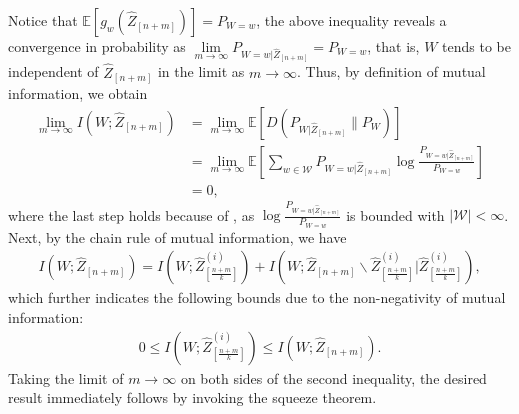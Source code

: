 \documentclass[onecolumn,romanappendices,10pt]{IEEEtran}
\newcommand{\Wcal}{{\mathcal W}}
\newcommand{\EE}{{\mathbb{E}}}
\begin{document}
	Notice that $\EE \left[ g_w(\hat{Z}_{[n+m]}) \right] = P_{W = w}$, the above inequality reveals a convergence in probability as $\lim\limits_{m \to \infty} P_{W = w | \hat{Z}_{[n+m]}} = P_{W = w}$, that is, $W$ tends to be independent of $\hat{Z}_{[n+m]}$ in the limit as $m \to \infty$. Thus, by definition of mutual information, we obtain
	\begin{equation}
		\begin{aligned}
			\lim_{m \to \infty} I\left( W; \hat{Z}_{[n+m]} \right) &= \lim_{m \to \infty} \EE \left[ D\left( P_{W|\hat{Z}_{[n+m]}} \| P_W \right) \right] \\
			&= \lim_{m \to \infty} \EE \left[ \sum_{w \in \Wcal} P_{W = w |\hat{Z}_{[n+m]}} \log \frac{P_{W = w |\hat{Z}_{[n+m]}}}{P_{W = w}} \right] \\
			&= 0,
		\end{aligned}
	\end{equation}
	where the last step holds because of {\cite[Theorem~2.3.4]{durrett2019probability}}, as $\log \frac{P_{W = w |\hat{Z}_{[n+m]}}}{P_{W = w}}$ is bounded with $|\Wcal| < \infty$. Next, by the chain rule of mutual information, we have
	\begin{equation}
		\begin{aligned}
			I\left( W; \hat{Z}_{[n+m]} \right) = I\left( W; \hat{Z}^{(i)}_{[\frac{n+m}{k}]} \right) + I\left( W; \hat{Z}_{[n+m]} \backslash \hat{Z}^{(i)}_{[\frac{n+m}{k}]} | \hat{Z}^{(i)}_{[\frac{n+m}{k}]} \right),
		\end{aligned}
	\end{equation}
	which further indicates the following bounds due to the non-negativity of mutual information:
	\begin{equation}
		\begin{aligned}
			0 \leq I\left( W; \hat{Z}^{(i)}_{[\frac{n+m}{k}]} \right) \leq I\left( W; \hat{Z}_{[n+m]} \right).
		\end{aligned}
	\end{equation}
	Taking the limit of $m \to \infty$ on both sides of the second inequality, the desired result immediately follows by invoking the squeeze theorem.
	
\end{document}
